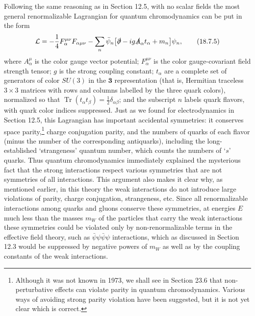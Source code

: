 Following the same reasoning as in Section 12.5, with no scalar fields the most general renormalizable Lagrangian for quantum chromodynamics can be put in the form
\begin{equation}
\mathcal{L}=-\frac{1}{4}F^{\mu\nu}_{\alpha}F_{\alpha\mu\nu}
-\sum_n\bar\psi_n\bigl[\sl{\partial}-ig\sl{A}_\alpha t_\alpha+m_n\bigr]\psi_n,
\tag{18.7.5}\label{eq:18.7.5}
\end{equation}
where $A^\mu_\alpha$ is the color gauge vector potential; $F^{\mu\nu}_\alpha$ is the color gauge-covariant field strength tensor; $g$ is the strong coupling constant; $t_\alpha$ are a complete set of generators of color $SU(3)$ in the $\mathbf{3}$ representation (that is, Hermitian traceless $3\times3$ matrices with rows and columns labelled by the three quark colors), normalized so that $\operatorname{Tr}(t_\alpha t_\beta)=\frac{1}{2}\delta_{\alpha\beta}$; and the subscript $n$ labels quark flavors, with quark color indices suppressed. Just as we found for electrodynamics in Section 12.5, this Lagrangian has important accidental symmetries: it conserves space parity,\footnote{Although it was not known in 1973, we shall see in Section 23.6 that non-perturbative effects can violate parity in quantum chromodynamics. Various ways of avoiding strong parity violation have been suggested, but it is not yet clear which is correct.} charge conjugation parity, and the numbers of quarks of each flavor (minus the number of the corresponding antiquarks), including the long-established `strangeness' quantum number, which counts the numbers of `$s$' quarks. Thus quantum chromodynamics immediately explained the mysterious fact that the strong interactions respect various symmetries that are not symmetries of all interactions. This argument also makes it clear why, as mentioned earlier, in this theory the weak interactions do not introduce large violations of parity, charge conjugation, strangeness, etc. Since all renormalizable interactions among quarks and gluons conserve these symmetries, at energies $E$ much less than the masses $m_W$ of the particles that carry the weak interactions these symmetries could be violated only by non-renormalizable terms in the effective field theory, such as $\bar\psi\psi\bar\psi\psi$ interactions, which as discussed in Section 12.3 would be suppressed by negative powers of $m_W$ as well as by the coupling constants of the weak interactions.

